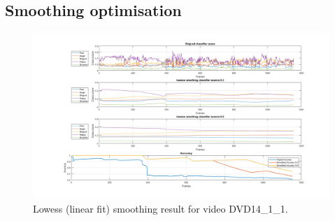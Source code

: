 %

%




\subsection{Smoothing optimisation}

%

%
%

\begin{figure}[t]
	\centering
	\includegraphics[width=1\textwidth, center]{Chapter5/Figs/DVD14_1lowess_smothing.png}
	\caption{\label{fig:TestOne}Lowess (linear fit) smoothing result for video DVD14\_1\_1.}
	\label{fig:DVD14_1lowess_smothing}
\end{figure}

